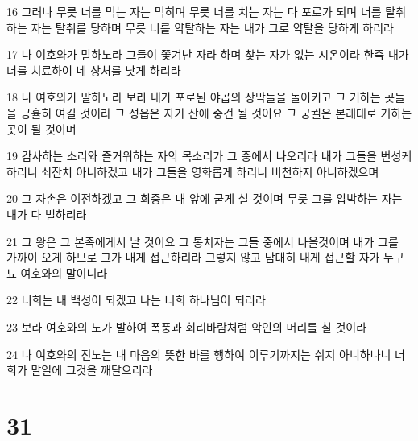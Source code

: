 \par 16 그러나 무릇 너를 먹는 자는 먹히며 무릇 너를 치는 자는 다 포로가 되며 너를 탈취하는 자는 탈취를 당하며 무릇 너를 약탈하는 자는 내가 그로 약탈을 당하게 하리라
\par 17 나 여호와가 말하노라 그들이 쫓겨난 자라 하며 찾는 자가 없는 시온이라 한즉 내가 너를 치료하여 네 상처를 낫게 하리라
\par 18 나 여호와가 말하노라 보라 내가 포로된 야곱의 장막들을 돌이키고 그 거하는 곳들을 긍휼히 여길 것이라 그 성읍은 자기 산에 중건 될 것이요 그 궁궐은 본래대로 거하는 곳이 될 것이며
\par 19 감사하는 소리와 즐거워하는 자의 목소리가 그 중에서 나오리라 내가 그들을 번성케 하리니 쇠잔치 아니하겠고 내가 그들을 영화롭게 하리니 비천하지 아니하겠으며
\par 20 그 자손은 여전하겠고 그 회중은 내 앞에 굳게 설 것이며 무릇 그를 압박하는 자는 내가 다 벌하리라
\par 21 그 왕은 그 본족에게서 날 것이요 그 통치자는 그들 중에서 나올것이며 내가 그를 가까이 오게 하므로 그가 내게 접근하리라 그렇지 않고 담대히 내게 접근할 자가 누구뇨 여호와의 말이니라
\par 22 너희는 내 백성이 되겠고 나는 너희 하나님이 되리라
\par 23 보라 여호와의 노가 발하여 폭풍과 회리바람처럼 악인의 머리를 칠 것이라
\par 24 나 여호와의 진노는 내 마음의 뜻한 바를 행하여 이루기까지는 쉬지 아니하나니 너희가 말일에 그것을 깨달으리라

\chapter{31}

